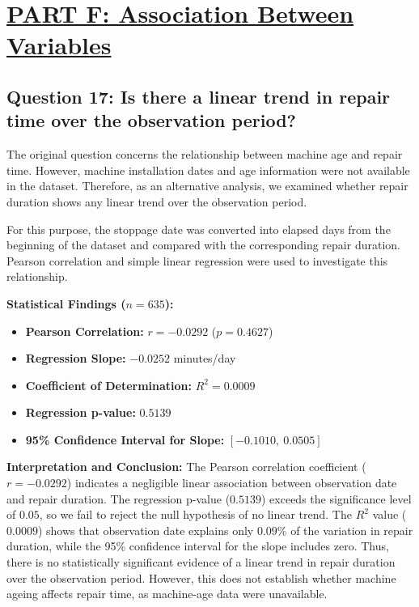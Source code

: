 
\section*{\underline{PART F: Association Between Variables}}


\subsection*{Question 17: Is there a linear trend in repair time over the observation period?}

The original question concerns the relationship between machine age and repair time. However, machine installation dates and age information were not available in the dataset. Therefore, as an alternative analysis, we examined whether repair duration shows any linear trend over the observation period.

For this purpose, the stoppage date was converted into elapsed days from the beginning of the dataset and compared with the corresponding repair duration. Pearson correlation and simple linear regression were used to investigate this relationship.

\textbf{Statistical Findings ($n = 635$):}

\begin{itemize}
    \item \textbf{Pearson Correlation:} $r = -0.0292$ ($p = 0.4627$)
    \item \textbf{Regression Slope:} $-0.0252$ minutes/day
    \item \textbf{Coefficient of Determination:} $R^2 = 0.0009$
    \item \textbf{Regression p-value:} $0.5139$
    \item \textbf{95\% Confidence Interval for Slope:} $[-0.1010,\ 0.0505]$
\end{itemize}

\textbf{Interpretation and Conclusion:}
The Pearson correlation coefficient ($r=-0.0292$) indicates a negligible linear association between observation date and repair duration. The regression p-value ($0.5139$) exceeds the significance level of $0.05$, so we fail to reject the null hypothesis of no linear trend. The $R^2$ value ($0.0009$) shows that observation date explains only $0.09\%$ of the variation in repair duration, while the 95\% confidence interval for the slope includes zero. Thus, there is no statistically significant evidence of a linear trend in repair duration over the observation period. However, this does not establish whether machine ageing affects repair time, as machine-age data were unavailable.


